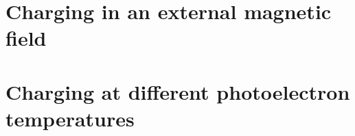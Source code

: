 \section{Charging in an external magnetic field}


\section{Charging at different photoelectron temperatures}
